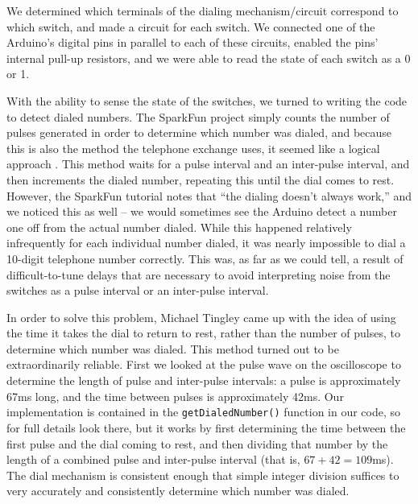 \documentclass{es50report}
\begin{document}
    We determined which terminals of the dialing mechanism/circuit correspond to which switch, and made a circuit for each switch. We connected one of the Arduino's digital pins in parallel to each of these circuits, enabled the pins' internal pull-up resistors, and we were able to read the state of each switch as a 0 or 1.

    With the ability to sense the state of the switches, we turned to writing the code to detect dialed numbers. The SparkFun project simply counts the number of pulses generated in order to determine which number was dialed, and because this is also the method the telephone exchange uses, it seemed like a logical approach \cite{seidle05}. This method waits for a pulse interval and an inter-pulse interval, and then increments the dialed number, repeating this until the dial comes to rest. However, the SparkFun tutorial notes that ``the dialing doesn't always work,'' and we noticed this as well -- we would sometimes see the Arduino detect a number one off from the actual number dialed. While this happened relatively infrequently for each individual number dialed, it was nearly impossible to dial a 10-digit telephone number correctly. This was, as far as we could tell, a result of difficult-to-tune delays that are necessary to avoid interpreting noise from the switches as a pulse interval or an inter-pulse interval.

    In order to solve this problem, Michael Tingley came up with the idea of using the time it takes the dial to return to rest, rather than the number of pulses, to determine which number was dialed. This method turned out to be extraordinarily reliable. First we looked at the pulse wave on the oscilloscope to determine the length of pulse and inter-pulse intervals: a pulse is approximately 67ms long, and the time between pulses is approximately 42ms. Our implementation is contained in the \verb+getDialedNumber()+ function in our code, so for full details look there, but it works by first determining the time between the first pulse and the dial coming to rest, and then dividing that number by the length of a combined pulse and inter-pulse interval (that is, $67 + 42 = 109$ms). The dial mechanism is consistent enough that simple integer division suffices to very accurately and consistently determine which number was dialed.
\end{document}

